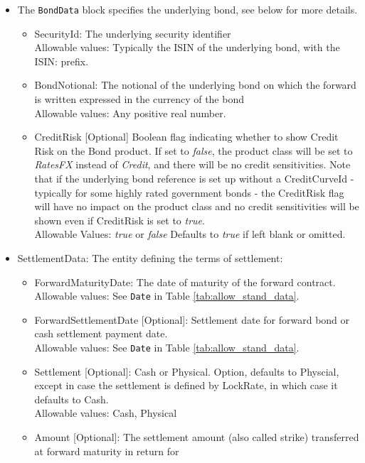 \begin{itemize}
   \item The {\tt BondData} block specifies the underlying bond, see below for more details.
   \begin{itemize}
     \item SecurityId: The underlying security identifier \\    
        Allowable values:  Typically the ISIN of the underlying bond, with the ISIN: prefix. 
     \item BondNotional: The notional of the underlying bond on which the forward is written expressed in the currency of
       the bond \\
        Allowable values:  Any positive real number.
    \item CreditRisk [Optional] Boolean flag indicating whether to show Credit Risk on the Bond product. If set to \emph{false}, the product class will be set to \emph{RatesFX} instead of \emph{Credit}, and there will be no credit sensitivities. Note that if the underlying bond reference is set up without a CreditCurveId - typically for some highly rated government bonds -  the CreditRisk flag will have no impact on the product class and no credit sensitivities will be shown even if CreditRisk is set to \emph{true}.\\
  Allowable Values: \emph{true} or \emph{false} Defaults to \emph{true} if left blank or omitted.    
   \end{itemize}
   \item SettlementData: The entity defining the terms of settlement:
   \begin{itemize}
       \item ForwardMaturityDate: The date of maturity of the forward contract. \\
         Allowable values: See \lstinline!Date! in Table \ref{tab:allow_stand_data}.
       \item ForwardSettlementDate [Optional]: Settlement date for forward bond or cash settlement payment date.  \\
         Allowable values: See \lstinline!Date! in Table \ref{tab:allow_stand_data}.
       \item Settlement [Optional]: Cash or Physical. Option, defaults to Physcial, except in case the settlement is
         defined by LockRate, in which case it defaults to Cash. \\
         Allowable values: Cash, Physical
       \item Amount [Optional]: The settlement amount (also called strike) transferred at forward maturity in return for

\end{itemize}
\end{itemize}
